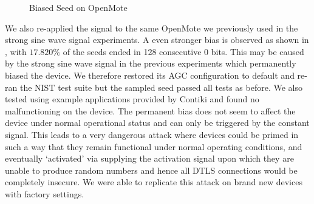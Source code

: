\begin{figure}[!t]
\centering
{}
\hfil
{}
\caption{Biased Seed on OpenMote}
\label{ConstantSignalBiased}
\end{figure}

We also re-applied the signal to the same OpenMote we previously used in the strong sine wave signal experiments. A even stronger bias is observed as shown in , with $17.820\%$ of the seeds ended in 128 consecutive $0$ bits. This may be caused by the strong sine wave signal in the previous experiments which permanently biased the device. We therefore restored its AGC configuration to default and re-ran the NIST test suite but the sampled seed passed all tests as before. We also tested using example applications provided by Contiki and found no malfunctioning on the device. The permanent bias does not seem to affect the device under normal operational status and can only be triggered by the constant signal. This leads to a very dangerous attack where devices could be primed in such a way that they remain functional under normal operating conditions, and eventually `activated' via supplying the activation signal upon which they are unable to produce random numbers and hence all DTLS connections would be completely insecure. We were able to replicate this attack on brand new devices with factory settings.

